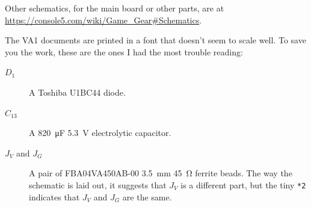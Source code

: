 \documentclass{article}
\begin{document}
Other schematics, for the main board or other parts, are at
\url{https://console5.com/wiki/Game_Gear#Schematics}.

The VA1 documents are printed in a font that doesn't seem to scale
well. To save you the work, these are the ones I had the most trouble
reading:

\begin{description}
\item[$D_1$] A Toshiba U1BC44 diode.
\item[$C_{13}$] A \qty{820}{\micro\farad} \qty{5.3}{\volt}
  electrolytic capacitor.
  
\item[$J_V$ and $J_G$] A pair of FBA04VA450AB-00
  \qty{3.5}{\milli\meter} \qty{45}{\ohm} ferrite beads. The way the
  schematic is laid out, it suggests that $J_V$ is a different part,
  but the tiny \texttt{*2} indicates that $J_V$ and $J_G$ are the same.
\end{description}
\end{document}
